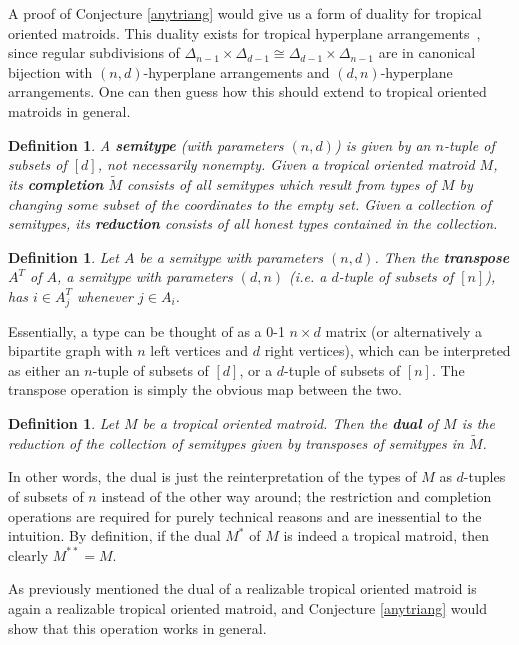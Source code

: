 \documentclass[11pt]{amsart}
\newtheorem{defn}[thm]{Definition}
\begin{document}
\medskip

A proof of Conjecture \ref{anytriang} would give us a form of duality for tropical oriented matroids. This duality exists for tropical hyperplane arrangements~\cite{DS}, since regular subdivisions of $\Delta_{n-1} \times \Delta_{d-1} \cong \Delta_{d-1}\times \Delta_{n-1}$ are in canonical bijection with $(n, d)$-hyperplane arrangements and $(d, 
n)$-hyperplane arrangements. One can then guess how this should extend to tropical oriented 
matroids in general.

\begin{defn}
A \textbf{semitype} (with parameters $(n, d)$) is given by an $n$-tuple of subsets 
of $[d]$, not necessarily nonempty. Given a tropical oriented matroid $M$, its \textbf{completion} $\widetilde{M}$ consists 
of all semitypes which result from types of $M$ by changing some subset of the 
coordinates to the empty set. Given a collection of semitypes, its \textbf{reduction} consists of all honest types contained in the 
collection. 
\end{defn}

\begin{defn}
Let $A$ be a semitype with parameters $(n, d)$. Then the \textbf{transpose} $A^T$ of $A$, a semitype with parameters $(d, n)$ (\emph{i.e.} a 
$d$-tuple of subsets of $[n]$), has $i\in A^T_j$ 
whenever $j\in A_i$. 
\end{defn}

Essentially, a type can be thought of as a 0-1 $n\times d$ matrix (or alternatively a bipartite graph with $n$ left vertices and $d$ right vertices), which can be interpreted as either an $n$-tuple of subsets of $[d]$, or a $d$-tuple of subsets of $[n]$. The transpose operation is simply the obvious map between the two.

\begin{defn}
Let $M$ be a tropical oriented matroid. Then the \textbf{dual} of $M$ is the reduction of the collection of 
semitypes given by transposes of semitypes in $\widetilde{M}$. 
\end{defn}

In other words, the dual is just the reinterpretation of the types of $M$ as $d$-tuples of subsets of $n$ instead of the other way around; the 
restriction and completion operations are required for purely technical reasons and are inessential to the intuition. By definition, if the dual $M^*$ of $M$ is indeed a tropical matroid, then clearly $M^{**}=M$.

As previously mentioned 
the dual of a realizable tropical oriented matroid is again a realizable tropical oriented matroid, and Conjecture \ref{anytriang} would show that this operation works in general.
\end{document}
